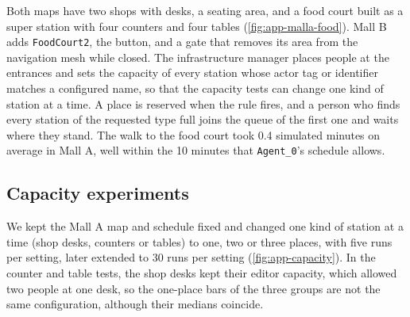 Both maps have two shops with desks, a seating area, and a food court built as a super station with four counters and four tables (\cref{fig:app-malla-food}). Mall B adds \texttt{FoodCourt2}, the button, and a gate that removes its area from the navigation mesh while closed. The infrastructure manager places people at the entrances and sets the capacity of every station whose actor tag or identifier matches a configured name, so that the capacity tests can change one kind of station at a time. A place is reserved when the rule fires, and a person who finds every station of the requested type full joins the queue of the first one and waits where they stand. The walk to the food court took 0.4 simulated minutes on average in Mall A, well within the 10 minutes that \texttt{Agent\_0}'s schedule allows.

\subsection{Capacity experiments}
\label{sub:app-mall-capacity}

We kept the Mall A map and schedule fixed and changed one kind of station at a time (shop desks, counters or tables) to one, two or three places, with five runs per setting, later extended to 30 runs per setting (\cref{fig:app-capacity}). In the counter and table tests, the shop desks kept their editor capacity, which allowed two people at one desk, so the one-place bars of the three groups are not the same configuration, although their medians coincide.


